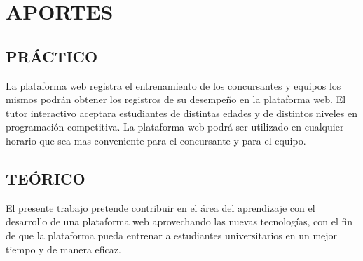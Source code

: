 \section{APORTES}
    \subsection{PRÁCTICO}
    La plataforma web registra el entrenamiento de los concursantes y equipos los mismos podrán obtener los registros de su desempeño en la plataforma web.
    El tutor interactivo aceptara estudiantes de distintas edades y de distintos niveles en programación competitiva. La plataforma web podrá ser utilizado en cualquier horario que sea mas conveniente para el concursante y para el equipo.  
    \subsection{TEÓRICO}
   El presente trabajo pretende contribuir en el área del aprendizaje con el desarrollo de una plataforma web aprovechando las nuevas tecnologías, con el fin de que la plataforma pueda entrenar a estudiantes universitarios en un mejor tiempo y de manera eficaz.